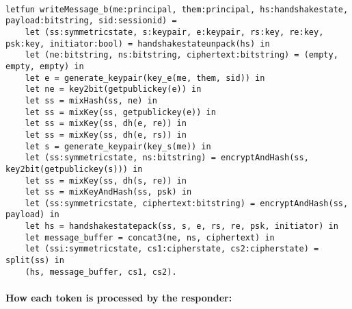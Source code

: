\begin{lstlisting}

letfun writeMessage_b(me:principal, them:principal, hs:handshakestate, payload:bitstring, sid:sessionid) =
	let (ss:symmetricstate, s:keypair, e:keypair, rs:key, re:key, psk:key, initiator:bool) = handshakestateunpack(hs) in
	let (ne:bitstring, ns:bitstring, ciphertext:bitstring) = (empty, empty, empty) in
	let e = generate_keypair(key_e(me, them, sid)) in
	let ne = key2bit(getpublickey(e)) in
	let ss = mixHash(ss, ne) in
	let ss = mixKey(ss, getpublickey(e)) in
	let ss = mixKey(ss, dh(e, re)) in
	let ss = mixKey(ss, dh(e, rs)) in
	let s = generate_keypair(key_s(me)) in
	let (ss:symmetricstate, ns:bitstring) = encryptAndHash(ss, key2bit(getpublickey(s))) in
	let ss = mixKey(ss, dh(s, re)) in
	let ss = mixKeyAndHash(ss, psk) in
	let (ss:symmetricstate, ciphertext:bitstring) = encryptAndHash(ss, payload) in
	let hs = handshakestatepack(ss, s, e, rs, re, psk, initiator) in
	let message_buffer = concat3(ne, ns, ciphertext) in
	let (ssi:symmetricstate, cs1:cipherstate, cs2:cipherstate) = split(ss) in
	(hs, message_buffer, cs1, cs2).

\end{lstlisting}

\paragraph{How each token is processed by the responder:}$ $

